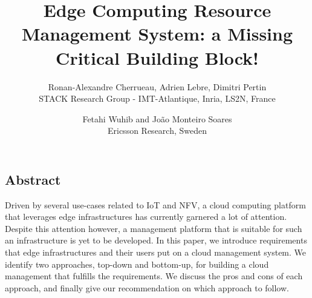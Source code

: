 \documentclass[letterpaper,twocolumn,10pt]{article}
\begin{document}
\date{}

\title{\Large Edge Computing Resource Management System: a Missing Critical Building Block!}

\author{
{\rm Ronan-Alexandre Cherrueau, Adrien Lebre, Dimitri Pertin}\\
STACK Research Group - IMT-Atlantique, Inria, LS2N, France
\and
{\rm Fetahi Wuhib and  João Monteiro Soares}\\
Ericsson Research, Sweden\\
} %

\maketitle

\thispagestyle{empty}


\subsection*{Abstract}
Driven by several use-cases related to IoT and NFV, a cloud computing platform that leverages edge infrastructures has currently garnered a lot of attention. Despite this attention however, a management platform that is suitable for such an infrastructure is yet to be developed. In this paper, we introduce requirements that edge infrastructures and their users put on a cloud management system. We identify two approaches, top-down and bottom-up, for building a cloud management that fulfills the requirements. We discuss the pros and cons of each approach, and finally give our recommendation on which approach to follow.         




% 
% 




{\footnotesize 
}

\theendnotes
\end{document}
